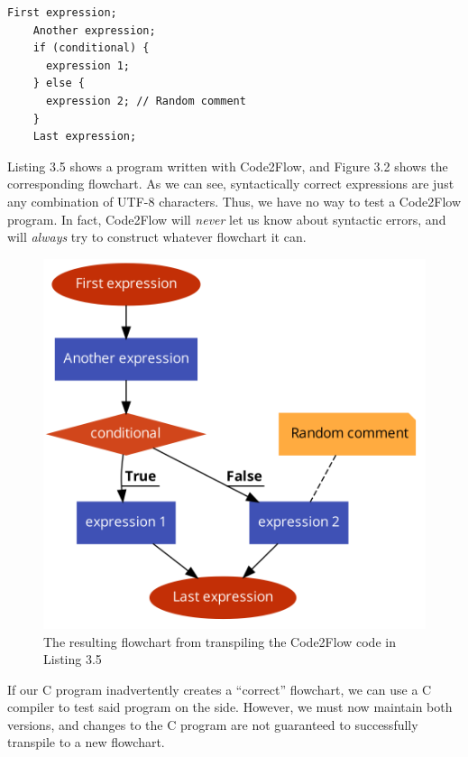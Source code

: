 \begin{lstlisting}[caption={A Code2Flow program}, captionpos=b]
    First expression;
    Another expression;
    if (conditional) {
      expression 1;
    } else {
      expression 2; // Random comment
    }
    Last expression;
\end{lstlisting}

Listing 3.5 shows a program written with Code2Flow, and Figure 3.2 shows the corresponding flowchart. As we can see, syntactically correct expressions are just any combination of UTF-8 characters. Thus, we have no way to test a Code2Flow program. In fact, Code2Flow will \textit{never} let us know about syntactic errors, and will \textit{always} try to construct whatever flowchart it can. \\

\begin{figure}[ht]
    \centering
    \includegraphics[scale=0.2]{assets/code2flow_example.png}
    \caption{The resulting flowchart from transpiling the Code2Flow code in Listing 3.5}
    \label{fig:code2flow}
\end{figure}

If our C program inadvertently creates a ``correct'' flowchart, we can use a C compiler to test said program on the side. However, we must now maintain both versions, and changes to the C program are not guaranteed to successfully transpile to a new flowchart.

